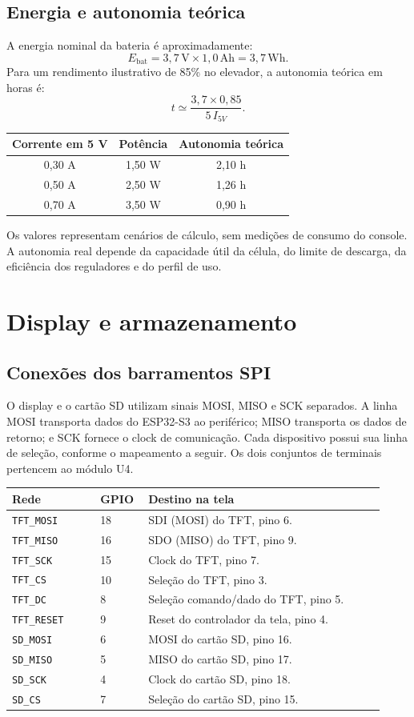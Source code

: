 \documentclass[12pt,a4paper]{article}
\begin{document}
\subsection{Energia e autonomia teórica}
A energia nominal da bateria é aproximadamente:
\[
  E_{\mathrm{bat}}=3{,}7\,\mathrm{V}\times1{,}0\,\mathrm{Ah}=3{,}7\,\mathrm{Wh}.
\]
Para um rendimento ilustrativo de 85\% no elevador, a autonomia teórica em horas é:
\[
  t\simeq\frac{3{,}7\times0{,}85}{5\,I_{5V}}.
\]
\begin{center}
  \begin{tabular}{ccc}
    \toprule
    \textbf{Corrente em 5 V} & \textbf{Potência} & \textbf{Autonomia teórica}\\
    \midrule
    0,30 A & 1,50 W & 2,10 h\\
    0,50 A & 2,50 W & 1,26 h\\
    0,70 A & 3,50 W & 0,90 h\\
    \bottomrule
  \end{tabular}
\end{center}
Os valores representam cenários de cálculo, sem medições de consumo do console. A autonomia real depende da capacidade útil da célula, do limite de descarga, da eficiência dos reguladores e do perfil de uso.

\section{Display e armazenamento}
\subsection{Conexões dos barramentos SPI}
O display e o cartão SD utilizam sinais MOSI, MISO e SCK separados. A linha MOSI transporta dados do ESP32-S3 ao periférico; MISO transporta os dados de retorno; e SCK fornece o clock de comunicação. Cada dispositivo possui sua linha de seleção, conforme o mapeamento a seguir. Os dois conjuntos de terminais pertencem ao módulo U4.
\begin{longtable}{@{}L{0.22\linewidth}L{0.12\linewidth}L{0.59\linewidth}@{}}
  \toprule
  \textbf{Rede} & \textbf{GPIO} & \textbf{Destino na tela}\\
  \midrule
  \endhead
  \texttt{TFT\_MOSI} & 18 & SDI (MOSI) do TFT, pino 6.\\
  \texttt{TFT\_MISO} & 16 & SDO (MISO) do TFT, pino 9.\\
  \texttt{TFT\_SCK} & 15 & Clock do TFT, pino 7.\\
  \texttt{TFT\_CS} & 10 & Seleção do TFT, pino 3.\\
  \texttt{TFT\_DC} & 8 & Seleção comando/dado do TFT, pino 5.\\
  \texttt{TFT\_RESET} & 9 & Reset do controlador da tela, pino 4.\\
  \texttt{SD\_MOSI} & 6 & MOSI do cartão SD, pino 16.\\
  \texttt{SD\_MISO} & 5 & MISO do cartão SD, pino 17.\\
  \texttt{SD\_SCK} & 4 & Clock do cartão SD, pino 18.\\
  \texttt{SD\_CS} & 7 & Seleção do cartão SD, pino 15.\\
  \bottomrule
\end{longtable}
\end{document}
